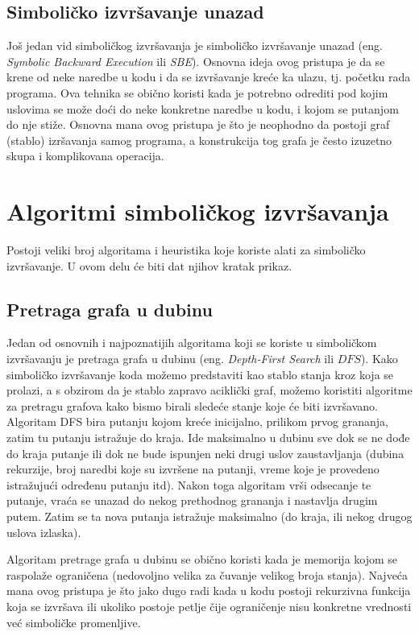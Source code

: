 \documentclass[12pt,oneside]{memoir}
\begin{document}
\subsection{Simboličko izvršavanje unazad} 
Još jedan vid simboličkog izvršavanja je simboličko izvršavanje unazad (eng. \textit{Symbolic Backward Execution} ili \textit{SBE}). Osnovna ideja ovog pristupa je da se krene od neke naredbe u kodu i da se izvršavanje kreće ka ulazu, tj. početku rada programa. Ova tehnika se obično koristi kada je potrebno odrediti pod kojim uslovima se može doći do neke konkretne naredbe u kodu, i kojom se putanjom do nje stiže. Osnovna mana ovog pristupa je što je neophodno da postoji graf (stablo) izršavanja samog programa, a konstrukcija tog grafa je često izuzetno skupa i komplikovana operacija.

\section{Algoritmi simboličkog izvršavanja}

Postoji veliki broj algoritama i heuristika koje koriste alati za simboličko izvršavanje. U ovom delu će biti dat njihov kratak prikaz.

\bigbreak

\subsection{Pretraga grafa u dubinu} \label{DFS}
Jedan od osnovnih i najpoznatijih algoritama koji se koriste u simboličkom izvršavanju je pretraga grafa u dubinu (eng. \textit{Depth-First Search} ili $DFS$). Kako simboličko izvršavanje koda možemo predstaviti kao stablo stanja kroz koja se prolazi, a s obzirom da je stablo zapravo aciklički graf, možemo koristiti algoritme za pretragu grafova kako bismo birali sledeće stanje koje će biti izvršavano. Algoritam DFS bira putanju kojom kreće inicijalno, prilikom prvog grananja, zatim tu putanju istražuje do kraja. Ide maksimalno u dubinu sve dok se ne dođe do kraja putanje ili dok ne bude ispunjen neki drugi uslov zaustavljanja (dubina rekurzije, broj naredbi koje su izvršene na putanji, vreme koje je provedeno istražujući određenu putanju itd). Nakon toga algoritam vrši odsecanje te putanje, vraća se unazad do nekog prethodnog grananja i nastavlja drugim putem. Zatim se ta nova putanja istražuje maksimalno (do kraja, ili nekog drugog uslova izlaska). 

Algoritam pretrage grafa u dubinu se obično koristi kada je memorija kojom se raspolaže ograničena (nedovoljno velika za čuvanje velikog broja stanja). Najveća mana ovog pristupa je što jako dugo radi kada u kodu postoji rekurzivna funkcija koja se izvršava ili ukoliko postoje petlje čije ograničenje nisu konkretne vrednosti već simboličke promenljive. 
\end{document}
